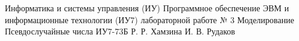 \documentclass{bmstu}
\begin{document}
\makereporttitle
	{Информатика и системы управления (ИУ)}
	{Программное обеспечение ЭВМ и информационные технологии (ИУ7)}
	{лабораторной работе № 3}
	{Моделирование}
	{Псевдослучайные числа}
	{}
	{ИУ7-73Б}
	{Р. Р. Хамзина}
	{И. В. Рудаков}

\maketableofcontents


\end{document}
